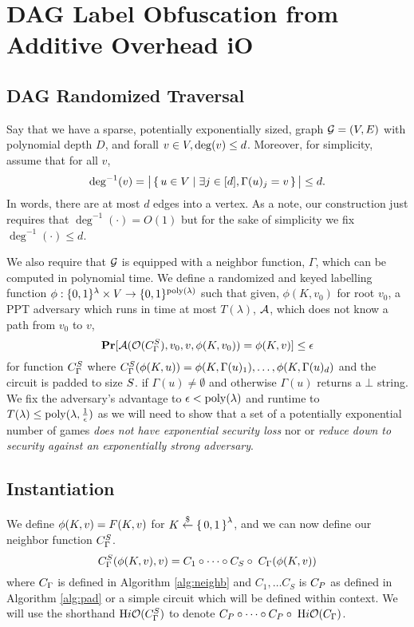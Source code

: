 \section{DAG Label Obfuscation from Additive Overhead iO}
\subsection{DAG Randomized Traversal}
Say that we have a sparse, potentially exponentially sized, graph $\mathcal{G} = (V, E)$ with polynomial depth $D$,
and forall $v \in V, \deg(v) \leq d$. Moreover, for simplicity,
assume that for all $v$, 
$$
\deg^{-1}(v) = \big|\set{u \in V \mid \exists j \in [d], \Gamma(u)_j = v}\big| \leq d.
$$
In words, there are at most $d$ edges into a vertex. As a note, our construction just requires
that $\deg^{-1}(\cdot) = O(1)$ but for the sake of simplicity we fix $\deg^{-1}(\cdot) \leq d$.

We also require that $\mathcal{G}$ is equipped with a neighbor function, $\Gamma$, which can be computed in polynomial time.
We define a randomized and keyed labelling function $\phi: \{0,1\}^\lambda \times V \rightarrow \{0,1\}^{\operatorname{poly}(\lambda)}$ 
such that given, $\phi(K, v_0)$ for root $v_0$, a PPT adversary which runs in time at most $T(\lambda)$, $\mathcal{A}$, which does not know a path from $v_0$ to $v$,
\begin{equation}
	\label{eq:guessPhi}
	\operatorname*{\mathbf{Pr}}[\mathcal{A}(\mathcal{O}({C_\Gamma^S}), v_0, v, \phi(K, v_0)) = \phi(K, v)] \leq \epsilon
\end{equation}
for function ${C_\Gamma^S}$ where ${C_\Gamma^S}(\phi(K, u)) = \phi(K, \Gamma(u)_1), \dots, \phi(K, \Gamma(u)_d)$ and the circuit is padded to size $S$.
if $\Gamma(u) \neq \emptyset$ and otherwise $\Gamma(u)$ returns a $\bot$ string.
We fix the adversary's advantage to $\epsilon < \operatorname{poly}(\lambda)$ and runtime to $T(\lambda) \leq \operatorname{poly}(\lambda, \frac{1}{\epsilon})$
as we will need to show
that a set of a potentially exponential number of games \emph{does not have exponential security loss}
nor or \emph{reduce down to security against an exponentially strong adversary}.

\subsection{Instantiation}
We define 
$
	\phi(K, v) = F(K, v)
$ for $K \overset{\$}{\gets} \set{0, 1}^\lambda$, and we can now define our neighbor function ${C_\Gamma^S}$.
\begin{equation}
	\label{eq:neighbfn}
	{C_\Gamma^S}(\phi(K, v), v) = C_1\circ\cdots \circ C_S \circ \; C_\Gamma(\phi(K, v))
\end{equation}
where $C_\Gamma$ is defined in Algorithm \ref{alg:neighb} and $C_1, \dots C_S$ is 
${C_P}$ as defined in Algorithm \ref{alg:pad} or a simple circuit which 
will be defined within context.
We will use the shorthand $\text{H}i\mathcal{O}({C_\Gamma^S})$ to denote 
$ {C_P} \circ \cdots \circ {C_P} \circ \; \text{H}i\mathcal{O}(C_\Gamma)$.

